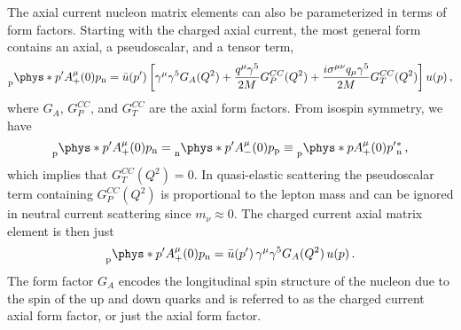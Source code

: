     The axial current nucleon matrix elements can also be parameterized in
    terms of form factors. Starting with the charged axial current, the most
    general form contains an axial, a pseudoscalar, and a tensor
    term,~\cite{Alberico:2001sd}
    \begin{equation}
      \prescript{}{\textrm{p}}{\phys*{p'}{A^{\mu}_+(0)}{p}}_{\textrm{n}} 
        = \bar{u}(p') \left[\gamma^{\mu}\gamma^{5} G_A(Q^2) 
          + \frac{q^{\mu}\gamma^{5}}{2M}G_P^{CC}(Q^2) 
          + \frac{i\sigma^{\mu\nu}q_{\mu}\gamma^{5}}{2M}G_T^{CC}(Q^2)\right] u(p) \,,
    \end{equation}
    where $G_A$, $G_P^{CC}$, and $G_T^{CC}$ are the axial form factors.  From
    isospin symmetry, we have
    \begin{equation}
      \prescript{}{\textrm{p}}{\phys*{p'}{A^{\mu}_+(0)}{p}}_{\textrm{n}} 
      = \prescript{}{\textrm{n}}{\phys*{p'}{A^{\mu}_-(0)}{p}}_{\textrm{p}} 
      \equiv \prescript{}{\textrm{p}}{\phys*{p}{A^{\mu}_+(0)}{p'}}_{\textrm{n}}^* \,,
    \end{equation}
    which implies that $G_T^{CC}(Q^2) = 0$. In quasi-elastic scattering the
    pseudoscalar term containing $G_P^{CC}(Q^2)$ is proportional to the lepton
    mass and can be ignored in neutral current scattering since $m_{\nu}\approx
    0$. The charged current axial matrix element is then just
    \begin{equation}
      \prescript{}{\textrm{p}}{\phys*{p'}{A^{\mu}_+(0)}{p}}_{\textrm{n}} 
        = \bar{u}(p') \,\gamma^{\mu}\gamma^{5} G_A(Q^2)\, u(p) \,.
    \end{equation}
    The form factor $G_A$ encodes the longitudinal spin structure of the
    nucleon due to the spin of the up and down quarks and is referred to as the
    charged current axial form factor, or just the axial form factor.

